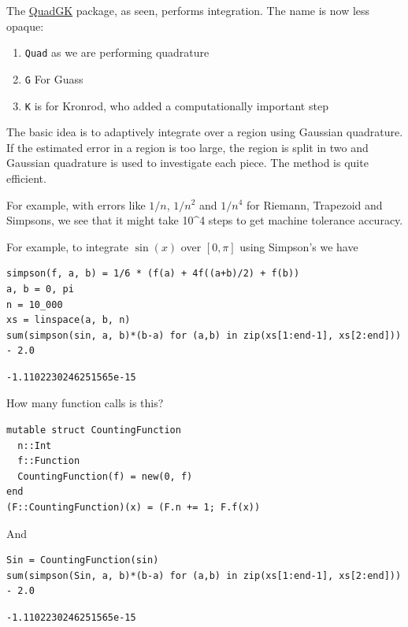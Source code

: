 \documentclass[12pt]{article}
\begin{document}
The \href{https://github.com/JuliaMath/QuadGK.jl}{QuadGK} package, as seen, performs integration. The name is now less opaque:

\begin{enumerate}\item 
\texttt{Quad} as we are performing quadrature\item 
\texttt{G} For Guass\item 
\texttt{K} is for Kronrod, who added a computationally important step\end{enumerate}


The basic idea is to adaptively integrate over a region using Gaussian quadrature. If the estimated error in a region is too large, the region is split in two and Gaussian quadrature is used to investigate each piece. The method is quite efficient.


For example, with errors like $1/n$, $1/n^2$ and $1/n^4$ for Riemann, Trapezoid and Simpsons, we see that it might take 10^4 steps to get machine tolerance accuracy.


For example, to integrate $\sin(x)$ over $[0, \pi]$ using Simpson's we have

\begin{Verbatim}[framesep=1mm,frame=leftline,fontfamily=courier,formatcom=\color{darker-gray}]
simpson(f, a, b) = 1/6 * (f(a) + 4f((a+b)/2) + f(b))
a, b = 0, pi
n = 10_000
xs = linspace(a, b, n)
sum(simpson(sin, a, b)*(b-a) for (a,b) in zip(xs[1:end-1], xs[2:end])) - 2.0
\end{Verbatim}
\begin{Verbatim}[framesep=3mm,frame=leftline, fontshape=it,formatcom=\color{darker-gray}]
-1.1102230246251565e-15
\end{Verbatim}
 

How many function calls is this?

\begin{Verbatim}[framesep=1mm,frame=leftline,fontfamily=courier,formatcom=\color{darker-gray}]
mutable struct CountingFunction
  n::Int
  f::Function
  CountingFunction(f) = new(0, f)
end
(F::CountingFunction)(x) = (F.n += 1; F.f(x))
\end{Verbatim}

And

\begin{Verbatim}[framesep=1mm,frame=leftline,fontfamily=courier,formatcom=\color{darker-gray}]
Sin = CountingFunction(sin)
sum(simpson(Sin, a, b)*(b-a) for (a,b) in zip(xs[1:end-1], xs[2:end])) - 2.0
\end{Verbatim}
\begin{Verbatim}[framesep=3mm,frame=leftline, fontshape=it,formatcom=\color{darker-gray}]
-1.1102230246251565e-15
\end{Verbatim}
 
\end{document}
